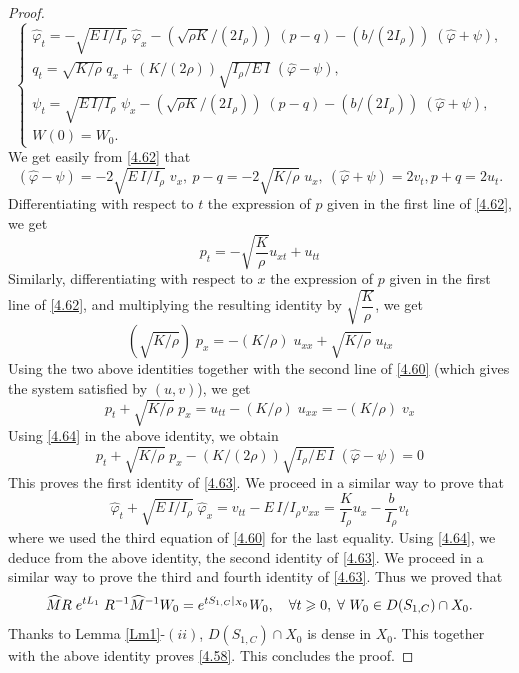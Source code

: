 \documentclass[10pt, english]{article}
\begin{document}
{\begin{proof}
\begin{equation}
\begin{cases}
\widehat{\varphi}_t=-\sqrt{E\, I/I_{\rho}}\; \widehat{\varphi}_{x}
-(\sqrt{\rho K}/(2I_{\rho}))\;(p-q) - (b/(2I_{\rho}))\;(\widehat{\varphi}+\psi), \\
q_t=\sqrt{K/\rho}\; q_{x} + (K/(2\rho))\sqrt{I_{\rho}/ E\, I}\; (\widehat{\varphi}-\psi), \\
\psi_t=\sqrt{E\, I/I_{\rho}}\; \psi_{x}
-(\sqrt{\rho K}/(2I_{\rho}))\;(p-q) - (b/(2I_{\rho}))\;(\widehat{\varphi}+\psi),\\
W(0)=W_0.
\end{cases}
\end{equation}
We get easily from \eqref{4.62} that 
\begin{equation}\label{4.64}
(\widehat{\varphi}-\psi)= -2\sqrt{E\, I / I_{\rho}}\; v_x, \ p-q= -2 \sqrt{K/\rho}\; u_x, \ (\widehat{\varphi}+\psi)=2v_t, p+q=2u_t.
\end{equation}
Differentiating with respect to $t$ the expression of $p$ given in the first line of \eqref{4.62}, we get
$$
p_t=-\sqrt{\dfrac{K}{\rho}}u_{xt}+ u_{tt} 
$$
Similarly, differentiating with respect to $x$ the expression of $p$ given in the first line of \eqref{4.62}, and multiplying
the resulting identity by $\sqrt{\dfrac{K}{\rho}}$, we get
$$
(\sqrt{K/\rho})\; p_{x}=-(K/\rho)\; u_{xx} + \sqrt{K/\rho}\; u_{tx}
$$
Using the two above identities together with the second line of \eqref{4.60} (which gives the system satisfied by $(u,v)$), we get
$$
p_t+\sqrt{K/\rho}\; p_{x}=u_{tt}-(K/\rho)\; u_{xx}=-(K/\rho)\;v_x
$$
Using \eqref{4.64} in the above identity, we obtain 
$$
p_t+\sqrt{K/\rho}\; p_{x}  - (K/(2\rho)) \sqrt{I_{\rho}/ E\, I}\; (\widehat{\varphi}-\psi)=0
$$
This proves the first identity of \eqref{4.63}.
 We proceed in a similar way to prove that
$$
\widehat{\varphi}_t+\sqrt{E\, I/I_{\rho}}\; \widehat{\varphi}_{x}=v_{tt} - E\, I/I_{\rho}v_{xx}=\dfrac{K}{I_{\rho }}u_{x}-\dfrac{b}{I_{\rho }}v_{t}
$$
where we used the third equation of \eqref{4.60} for the last equality.
Using \eqref{4.64}, we deduce from the above identity, the second identity of \eqref{4.63}. We proceed in a similar way to prove the third and fourth identity of \eqref{4.63}. 
Thus we proved that 
$$
\widehat{M}R\; e^{tL_1}\; R^{-1}\widehat{M}^{-1}W_0=e^{tS_{1,C}\small{|}_{X_0}}W_0, \quad \forall  t \geqslant 0,\; \forall \ W_0 \in D(S_{1,C})\cap X_0.
$$
Thanks to Lemma \ref{Lm1}-$(ii)$, $D(S_{1,C})\cap X_0$ is dense in $X_0$. This together with the above identity proves \eqref{4.58}. This concludes the proof.
\end{proof}

}
\end{document}
